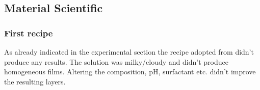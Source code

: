 \subsection{Material Scientific}
\subsubsection{First recipe} 
As already indicated in the experimental section the recipe adopted from \cite{Anwar2017} didn't produce any  results. 
The solution was milky/cloudy and didn't produce homogeneous films. 
Altering the composition, pH, surfactant etc. didn't improve the resulting layers. 

